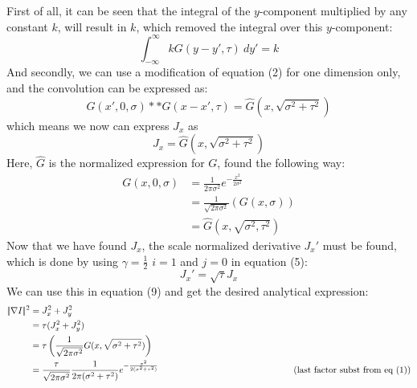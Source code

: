 \documentclass[a4paper]{article}
\newcommand{\comment}[1]{%
  \text{\phantom{(#1)}} \tag{#1}}
\begin{document}
First of all, it can be seen that the integral of the $y$-component multiplied by any constant $k$,  will result in $k$, which removed the integral over this $y$-component:
$$
  \int^{\infty}_{-\infty} k G(y-y',\tau)\:dy' = k
$$
And secondly, we can use a modification of equation (2) for one dimension only, and the convolution can be expressed as:
$$
  G(x',0,\sigma)**G(x-x',\tau) = \hat{G}(x,\sqrt{\sigma^2 + \tau^2})
$$
which means we now can express $J_x$ as
$$
  J_x = \hat{G}(x,\sqrt{\sigma^2 +\tau^2})
$$
Here, $\hat{G}$ is the normalized expression for $G$, found the following way:
\begin{align*}
  G(x,0,\sigma) &= \frac{1}{2\pi\sigma^2}e^{-\frac{x^2}{2\sigma^2} } \\
                &= \frac{1}{\sqrt{2\pi\sigma^2}} (G(x,\sigma))\\
                &= \hat{G}(x,\sqrt{\sigma^2, \tau^2})
\end{align*}
Now that we have found $J_x$, the scale normalized derivative $J_x'$ must be found, which is done by using $\gamma = \frac{1}{2} $ $i=1$ and $j=0$ in equation (5):
$$
J_x' = \sqrt{\tau}J_x
$$
We can use this in equation (9) and get the desired analytical expression:
\begin{align*}
  |\!| \nabla I |\!|^2 &= J_x^2 + J_y^2\\
                       &= \tau (J_x^2 + J_y^2)\\
                       &= \tau \left( \frac{1}{\sqrt{ 2\pi\sigma^2}}G(x,\sqrt{\sigma^2 + \tau^2})  \right)\\
                       &= \frac{\tau}{\sqrt{2\pi\sigma^2}} \frac{1}{2\pi(\sigma^2 + \tau^2)} e^{- \frac{x^2}{2(\sigma^2 + \tau^2)} } \comment{last factor subst from eq (1)}
\end{align*}
\end{document}
